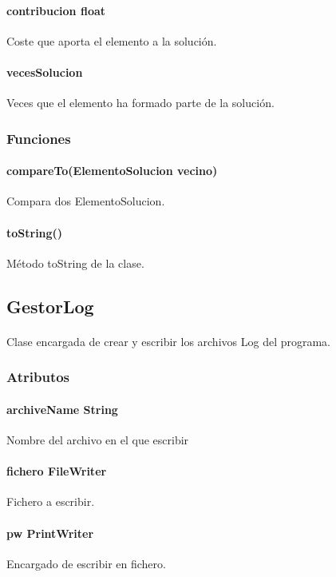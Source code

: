 \documentclass{article}
\begin{document}
	\paragraph{contribucion float}Coste que aporta el elemento a la solución.
	
	\paragraph{vecesSolucion}Veces que el elemento ha formado parte de la solución.
	
	\subsubsection{Funciones}
	
	\paragraph{compareTo(ElementoSolucion vecino)}Compara dos ElementoSolucion.
	
	\paragraph{toString()}Método toString de la clase.
	
	\subsection{GestorLog}
	
	\paragraph{}Clase encargada de crear y escribir los archivos Log del programa.
	
	\subsubsection{Atributos}
	
	\paragraph{archiveName String} Nombre del archivo en el que escribir
	
	\paragraph{fichero FileWriter} Fichero a escribir.
	
	\paragraph{pw PrintWriter} Encargado de escribir en fichero.
	
\end{document}
